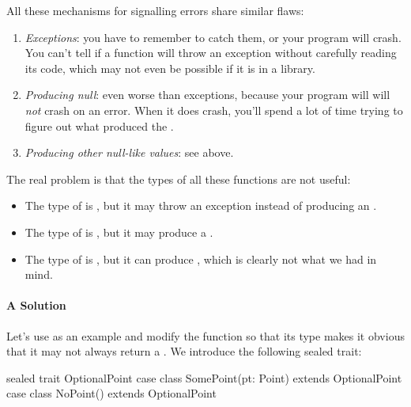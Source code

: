 \documentclass{book}
\begin{document}
All these mechanisms for signalling errors share similar flaws:
%
\begin{enumerate}

  \item \emph{Exceptions}: you have to remember to catch them, or your program will
   crash. You can't tell if a function will throw an exception without carefully
   reading its code, which may not even be possible if it is in a library.

  \item  \emph{Producing null}: even worse than exceptions, because your program
   will will \emph{not} crash on an error. When it does crash, you'll spend a
   lot of time trying to figure out what produced the .

   \item \emph{Producing other null-like values}: see above.

 \end{enumerate}

The real problem is that the types of all these functions are not useful:

\begin{itemize}

  \item The type of  is
  , but it may throw an exception instead of producing an .

  \item The type of  is , but it
  may produce a .

  \item The type of  is ,
  but it can produce , which is clearly not what we
  had in mind.

\end{itemize}

\paragraph{A Solution}

Let's use  as an example and modify the function so that its type
makes it obvious that it may not always return a . We introduce
the following sealed trait:

\begin{scalacode}
sealed trait OptionalPoint
case class SomePoint(pt: Point) extends OptionalPoint
case class NoPoint() extends OptionalPoint
\end{scalacode}
\end{document}
